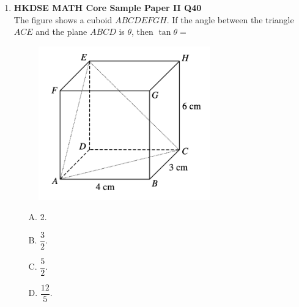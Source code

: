 \documentclass[12pt]{article}
\begin{document}
\begin{enumerate}
	\item \textbf{HKDSE MATH Core Sample Paper II Q40}\\
	The figure shows a cuboid $ABCDEFGH$. If the angle between the triangle $ACE$ and the plane $ABCD$ is $\theta$, then $\tan{\theta} = $
	\begin{figure}[H]
		\centering
		\includegraphics[width = 0.7\textwidth]{SPFigure2.40.png}	
	\end{figure}
	\begin{enumerate}
		\item[A.] 2.
		\item[B.] $\dfrac{3}{2}$.
		\item[C.] $\dfrac{5}{2}$.
		\item[D.] $\dfrac{12}{5}$.
	\end{enumerate}
	

\end{enumerate}
\end{document}
